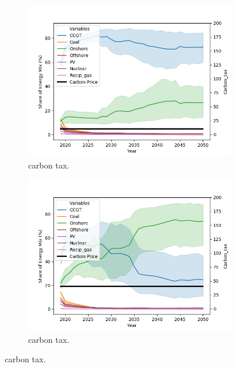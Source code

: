 \begin{figure}[h!]
	\centering
	\begin{subfigure}[b]{0.475\textwidth}
		\centering
		\includegraphics[width=\textwidth]{figures/scenarios/demand101-carbon10-datetime.png}
		\caption[Network2]%
		{{\small {} carbon tax.}}    
		\label{fig:demand101carbon10}
	\end{subfigure}
	\hfill
	\begin{subfigure}[b]{0.475\textwidth}  
		\centering 
		\includegraphics[width=\textwidth]{figures/scenarios/demand101-carbon40-datetime.png}
		\caption[]%
		{{ carbon tax.}}    
		\label{fig:demand101carbon40}
	\end{subfigure}

\end{figure}
